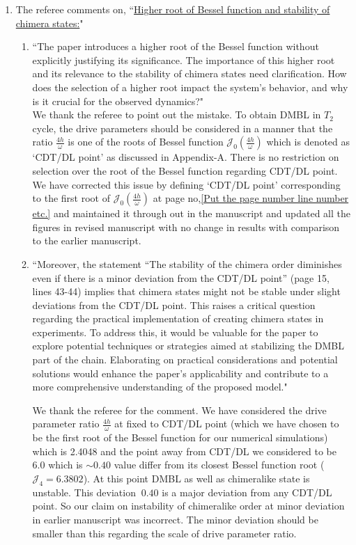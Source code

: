 \documentclass[aps,prb,reprint,showpacs,floatfix,superscriptaddress, onecolumn, nofootinbib, 10pt]{revtex4-2}
\newcommand{\response}[1]{{\color{black}#1}} %
\newcommand{\comment}[1]{{\color{blue}#1}} %
\begin{document}
\begin{enumerate}
\begin{enumerate}
{		}
		\item The referee comments on, \comment{``\underline{Higher root of Bessel function and stability of chimera states:}"}\\
		\begin{enumerate}
			\item \comment{``The paper introduces a higher root of the Bessel function without explicitly justifying its significance. The importance of this higher root and its relevance to the stability
				of chimera states need clarification. How does the selection of a higher root impact the system's behavior, and why is it crucial for the observed dynamics?"}\\
			
			\response{We thank the referee to point out the mistake. To obtain DMBL in $T_2$ cycle, the drive parameters should be considered in a manner that the ratio $\frac{4h}{\omega}$ is one of the roots of Bessel function $\mathcal{J}_0\left(\frac{4h}{\omega}\right)$ which is denoted as `CDT/DL point' as discussed in Appendix-A. There is no restriction on selection over the root of the Bessel function regarding CDT/DL point. We have corrected this issue by defining `CDT/DL point' corresponding to the first root of $\mathcal{J}_0\left(\frac{4h}{\omega}\right)$ at page no,\ref{Put the page number line number etc.} and maintained it through out in the manuscript and updated all the figures in revised manuscript with no change in results with comparison to the earlier manuscript. 
			}\\
			\item \comment{``Moreover, the statement “The stability of the chimera order diminishes even if there is a minor deviation from the CDT/DL point” (page 15, lines 43-44) implies that chimera states might not be stable under slight deviations from the CDT/DL point. This raises a critical question regarding the practical implementation of creating chimera states in experiments. To address this, it would be valuable for the paper to explore potential techniques or strategies aimed at stabilizing the DMBL part of the chain. Elaborating on practical considerations and potential solutions would enhance the paper's applicability and contribute to a more comprehensive understanding of the proposed model."}\\
			
			\response{We thank the referee for the comment. We have considered the drive parameter ratio $\frac{4h}{\omega}$ at fixed to CDT/DL point (which we have chosen to be the first root of the Bessel function for our numerical simulations) which is 2.4048 and the point away from CDT/DL we considered to be 6.0 which is $\sim0.40$ value differ from its closest Bessel function root ($\mathcal{J}_4 =6.3802$). At this point DMBL as well as chimeralike state is unstable. This deviation $~0.40$ is a major deviation from any CDT/DL point. So our claim on instability of chimeralike order at minor deviation in earlier manuscript was incorrect. The minor deviation should be smaller than this regarding the scale of drive parameter ratio. 
				
}
\end{enumerate}
\end{enumerate}
\end{enumerate}
\end{document}
